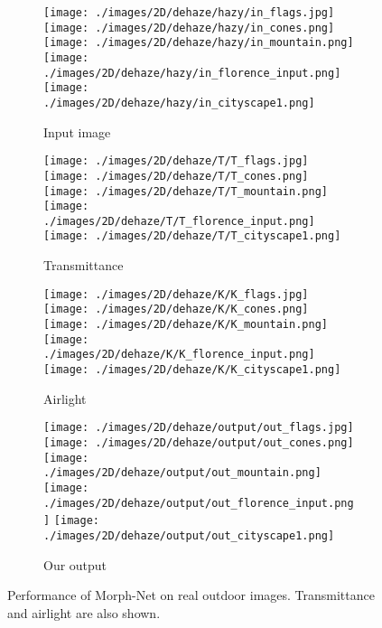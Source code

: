 \documentclass[12pt]{article}
\begin{document}
\begin{figure*}[h]
\begin{subfigure}[t]{0.24\linewidth}
\texttt{[image: ./images/2D/dehaze/hazy/in\_flags.jpg]}
\texttt{[image: ./images/2D/dehaze/hazy/in\_cones.png]}
\texttt{[image: ./images/2D/dehaze/hazy/in\_mountain.png]}
\texttt{[image: ./images/2D/dehaze/hazy/in\_florence\_input.png]}
\texttt{[image: ./images/2D/dehaze/hazy/in\_cityscape1.png]}
\caption{Input image}
\end{subfigure}
\begin{subfigure}[t]{0.24\linewidth}
\texttt{[image: ./images/2D/dehaze/T/T\_flags.jpg]}
\texttt{[image: ./images/2D/dehaze/T/T\_cones.png]}
\texttt{[image: ./images/2D/dehaze/T/T\_mountain.png]}
\texttt{[image: ./images/2D/dehaze/T/T\_florence\_input.png]}
\texttt{[image: ./images/2D/dehaze/T/T\_cityscape1.png]}
\caption{Transmittance}
\end{subfigure}
\begin{subfigure}[t]{0.24\linewidth}
\texttt{[image: ./images/2D/dehaze/K/K\_flags.jpg]}
\texttt{[image: ./images/2D/dehaze/K/K\_cones.png]}
\texttt{[image: ./images/2D/dehaze/K/K\_mountain.png]}
\texttt{[image: ./images/2D/dehaze/K/K\_florence\_input.png]}
\texttt{[image: ./images/2D/dehaze/K/K\_cityscape1.png]}
\caption{Airlight}
\end{subfigure}
\begin{subfigure}[t]{0.24\linewidth}
\texttt{[image: ./images/2D/dehaze/output/out\_flags.jpg]}
\texttt{[image: ./images/2D/dehaze/output/out\_cones.png]}
\texttt{[image: ./images/2D/dehaze/output/out\_mountain.png]}
\texttt{[image: ./images/2D/dehaze/output/out\_florence\_input.png]}
\texttt{[image: ./images/2D/dehaze/output/out\_cityscape1.png]}
\caption{Our output}
\end{subfigure}
\caption{Performance of Morph-Net on real outdoor images. Transmittance and airlight are also shown.}
\label{qual_real}
\end{figure*}
\end{document}
